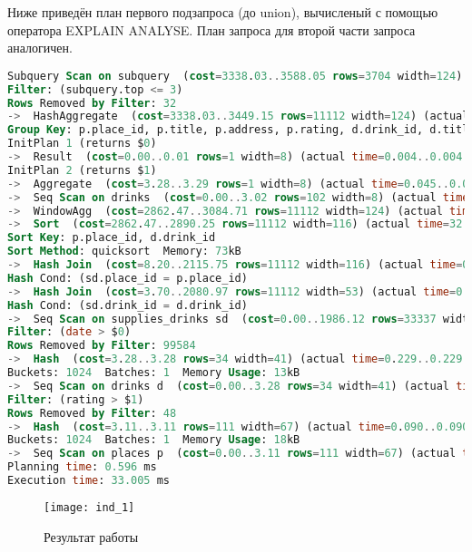 Ниже приведён план первого подзапроса (до union), вычисленый с помощью оператора EXPLAIN ANALYSE.
План запроса для второй части запроса аналогичен.
\begin{lstlisting}[language=SQL, caption={План запроса}]
Subquery Scan on subquery  (cost=3338.03..3588.05 rows=3704 width=124) (actual time=32.642..32.830 rows=202 loops=1)
Filter: (subquery.top <= 3)
Rows Removed by Filter: 32
->  HashAggregate  (cost=3338.03..3449.15 rows=11112 width=124) (actual time=32.640..32.800 rows=234 loops=1)
Group Key: p.place_id, p.title, p.address, p.rating, d.drink_id, d.title, d.rating, sd.date, row_number() OVER (?)
InitPlan 1 (returns $0)
->  Result  (cost=0.00..0.01 rows=1 width=8) (actual time=0.004..0.004 rows=1 loops=1)
InitPlan 2 (returns $1)
->  Aggregate  (cost=3.28..3.29 rows=1 width=8) (actual time=0.045..0.045 rows=1 loops=1)
->  Seq Scan on drinks  (cost=0.00..3.02 rows=102 width=8) (actual time=0.005..0.018 rows=102 loops=1)
->  WindowAgg  (cost=2862.47..3084.71 rows=11112 width=124) (actual time=32.305..32.448 rows=234 loops=1)
->  Sort  (cost=2862.47..2890.25 rows=11112 width=116) (actual time=32.297..32.313 rows=234 loops=1)
Sort Key: p.place_id, d.drink_id
Sort Method: quicksort  Memory: 73kB
->  Hash Join  (cost=8.20..2115.75 rows=11112 width=116) (actual time=0.382..32.075 rows=234 loops=1)
Hash Cond: (sd.place_id = p.place_id)
->  Hash Join  (cost=3.70..2080.97 rows=11112 width=53) (actual time=0.284..31.801 rows=234 loops=1)
Hash Cond: (sd.drink_id = d.drink_id)
->  Seq Scan on supplies_drinks sd  (cost=0.00..1986.12 rows=33337 width=16) (actual time=0.047..31.304 rows=426 loops=1)
Filter: (date > $0)
Rows Removed by Filter: 99584
->  Hash  (cost=3.28..3.28 rows=34 width=41) (actual time=0.229..0.229 rows=54 loops=1)
Buckets: 1024  Batches: 1  Memory Usage: 13kB
->  Seq Scan on drinks d  (cost=0.00..3.28 rows=34 width=41) (actual time=0.056..0.081 rows=54 loops=1)
Filter: (rating > $1)
Rows Removed by Filter: 48
->  Hash  (cost=3.11..3.11 rows=111 width=67) (actual time=0.090..0.090 rows=110 loops=1)
Buckets: 1024  Batches: 1  Memory Usage: 18kB
->  Seq Scan on places p  (cost=0.00..3.11 rows=111 width=67) (actual time=0.014..0.046 rows=110 loops=1)
Planning time: 0.596 ms
Execution time: 33.005 ms
\end{lstlisting}

\begin{figure}[H]
	\begin{center}
		\texttt{[image: ind\_1]}
		\caption{Результат работы} 
		\label{pic:ind_1} %
	\end{center}
\end{figure}

